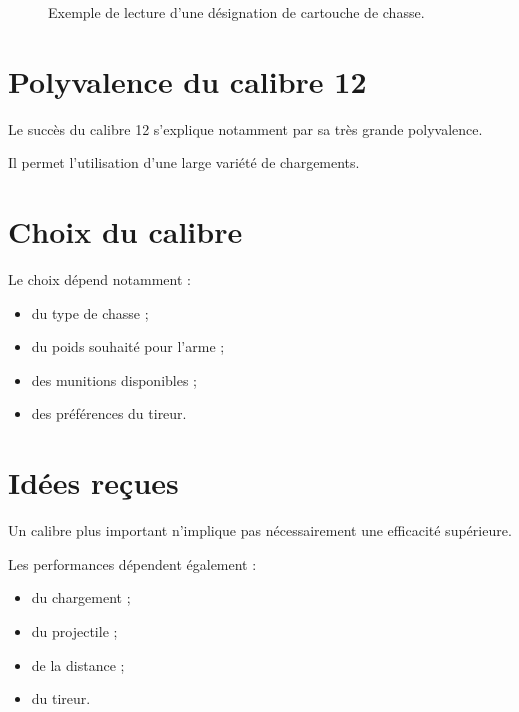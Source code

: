 \begin{figure}[htbp]
\centering


\caption{Exemple de lecture d'une désignation de cartouche de chasse.}
\label{fig:designation_1270}

\end{figure}

\section{Polyvalence du calibre 12}

Le succès du calibre 12 s'explique notamment par sa très grande polyvalence.

Il permet l'utilisation d'une large variété de chargements.

\section{Choix du calibre}

Le choix dépend notamment :

\begin{itemize}
    \item du type de chasse ;
    \item du poids souhaité pour l'arme ;
    \item des munitions disponibles ;
    \item des préférences du tireur.
\end{itemize}

\section{Idées reçues}

Un calibre plus important n'implique pas nécessairement une efficacité
supérieure.

Les performances dépendent également :

\begin{itemize}
    \item du chargement ;
    \item du projectile ;
    \item de la distance ;
    \item du tireur.
\end{itemize}

